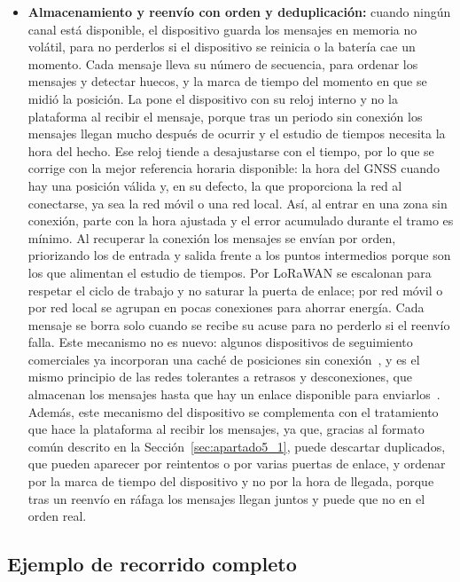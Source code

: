 \documentclass[11pt,a4paper]{article}
\begin{document}
\begin{itemize}
    \item \textbf{Almacenamiento y reenvío con orden y deduplicación:} cuando ningún canal está disponible, el dispositivo guarda los mensajes en memoria no volátil, para no perderlos si el dispositivo se reinicia o la batería cae un momento. Cada mensaje lleva su número de secuencia, para ordenar los mensajes y detectar huecos, y la marca de tiempo del momento en que se midió la posición. La pone el dispositivo con su reloj interno y no la plataforma al recibir el mensaje, porque tras un periodo sin conexión los mensajes llegan mucho después de ocurrir y el estudio de tiempos necesita la hora del hecho. Ese reloj tiende a desajustarse con el tiempo, por lo que se corrige con la mejor referencia horaria disponible: la hora del GNSS cuando hay una posición válida y, en su defecto, la que proporciona la red al conectarse, ya sea la red móvil o una red local. Así, al entrar en una zona sin conexión, parte con la hora ajustada y el error acumulado durante el tramo es mínimo. Al recuperar la conexión los mensajes se envían por orden, priorizando los de entrada y salida frente a los puntos intermedios porque son los que alimentan el estudio de tiempos. Por LoRaWAN se escalonan para respetar el ciclo de trabajo y no saturar la puerta de enlace; por red móvil o por red local se agrupan en pocas conexiones para ahorrar energía. Cada mensaje se borra solo cuando se recibe su acuse para no perderlo si el reenvío falla. Este mecanismo no es nuevo: algunos dispositivos de seguimiento comerciales ya incorporan una caché de posiciones sin conexión~\cite{ref37}, y es el mismo principio de las redes tolerantes a retrasos y desconexiones, que almacenan los mensajes hasta que hay un enlace disponible para enviarlos~\cite{ref38}. Además, este mecanismo del dispositivo se complementa con el tratamiento que hace la plataforma al recibir los mensajes, ya que, gracias al formato común descrito en la Sección~\ref{sec:apartado5_1}, puede descartar duplicados, que pueden aparecer por reintentos o por varias puertas de enlace, y ordenar por la marca de tiempo del dispositivo y no por la hora de llegada, porque tras un reenvío en ráfaga los mensajes llegan juntos y puede que no en el orden real.
\end{itemize}

\subsection{Ejemplo de recorrido completo}
\label{sec:apartado5_3}
\end{document}
